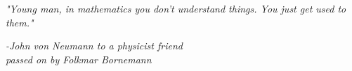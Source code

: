 \clearpage
{}

\begin{center}
\vspace*{11cm}
\textit{"Young man, in mathematics you don't understand
things. You just get used to them."}
\end{center}
\par
\hspace*{7cm}
\textit{-John von Neumann to a physicist friend}\\
\hspace*{8.5cm}
\textit{passed on by Folkmar Bornemann}
